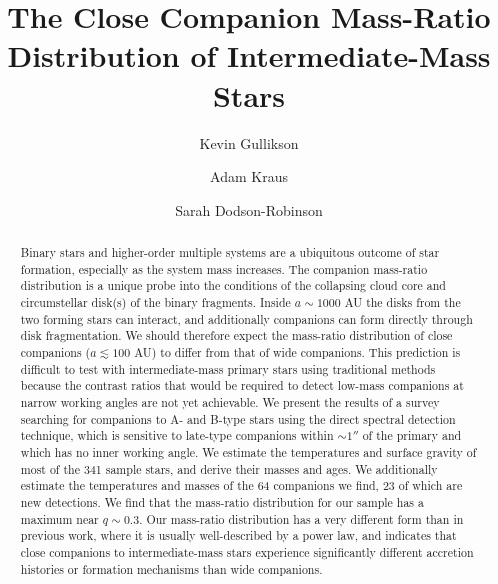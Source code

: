 \documentclass{emulateapj}
\begin{document}
\title{The Close Companion Mass-Ratio Distribution of Intermediate-Mass Stars}

\author{Kevin Gullikson }
\author{Adam Kraus }
\author{Sarah Dodson-Robinson }



\begin{abstract}
Binary stars and higher-order multiple systems are a ubiquitous outcome of star formation, especially as the system mass increases. The companion mass-ratio distribution is a unique probe into the conditions of the collapsing cloud core and circumstellar disk(s) of the binary fragments. Inside $a \sim 1000$ AU the disks from the two forming stars can interact, and additionally companions can form directly through disk fragmentation. We should therefore expect the mass-ratio distribution of close companions ($a \lesssim 100$ AU) to differ from that of wide companions. This prediction is difficult to test with intermediate-mass primary stars using traditional methods because the contrast ratios that would be required to detect low-mass companions at narrow working angles are not yet achievable. We present the results of a survey searching for companions to A- and B-type stars using the direct spectral detection technique, which is sensitive to late-type companions within $\sim 1''$ of the primary and which has no inner working angle. We estimate the temperatures and surface gravity of most of the 341 sample stars, and derive their masses and ages. We additionally estimate the temperatures and masses of the 64 companions we find, 23 of which are new detections. We find that the mass-ratio distribution for our sample has a maximum near $q \sim 0.3$. Our mass-ratio distribution has a very different form than in previous work, where it is usually well-described by a power law, and indicates that close companions to intermediate-mass stars experience significantly different accretion histories or formation mechanisms than wide companions.
\end{abstract}

\maketitle
\end{document}
